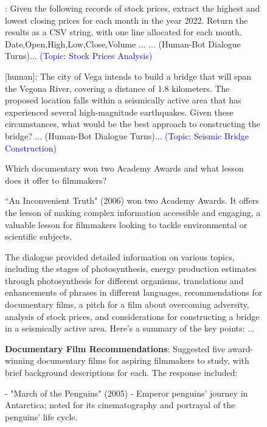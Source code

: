 \begin{figure}[htb]
\begin{tcolorbox}[left=3pt,right=3pt,top=3pt,bottom=3pt,title=\textbf{Conversation History:}]
[human]: Given the following records of stock prices, extract the highest and lowest closing prices for each month in the year 2022. Return the results as a CSV string, with one line allocated for each month. Date,Open,High,Low,Close,Volume ... ... (Human-Bot Dialogue Turns)...  \textcolor{blue}{(Topic: Stock Prices Analysis)}

[human]: The city of Vega intends to build a bridge that will span the Vegona River, covering a distance of 1.8 kilometers. The proposed location falls within a seismically active area that has experienced several high-magnitude earthquakes. Given these circumstances, what would be the best approach to constructing the bridge? ... (Human-Bot Dialogue Turns)...  \textcolor{blue}{(Topic: Seismic Bridge Construction)}
\end{tcolorbox}
\begin{tcolorbox}[left=3pt,right=3pt,top=3pt,bottom=3pt,title=\textbf{Question:}]
Which documentary won two Academy Awards and what lesson does it offer to filmmakers?
\end{tcolorbox}
\begin{tcolorbox}[left=3pt,right=3pt,top=3pt,bottom=3pt,title=\textbf{Ground-Truth Answer:}]
``An Inconvenient Truth" (2006) won two Academy Awards. It offers the lesson of making complex information accessible and engaging, a valuable lesson for filmmakers looking to tackle environmental or scientific subjects.
\end{tcolorbox}
\begin{tcolorbox}[left=3pt,right=3pt,top=3pt,bottom=3pt,title=\textbf{Memory generated by RecurSum~\citep{wang2023recursively}:}]
The dialogue provided detailed information on various topics, including the stages of photosynthesis, energy production estimates through photosynthesis for different organisms, translations and enhancements of phrases in different languages, recommendations for documentary films, a pitch for a film about overcoming adversity, analysis of stock prices, and considerations for constructing a bridge in a seismically active area. Here's a summary of the key points: ...

\textbf{Documentary Film Recommendations}: Suggested five award-winning documentary films for aspiring filmmakers to study, with brief background descriptions for each. The response included:

-  "March of the Penguins" (2005) - Emperor penguins' journey in Antarctica; noted for its cinematography and portrayal of the penguins' life cycle.


\end{tcolorbox}
\end{figure}
